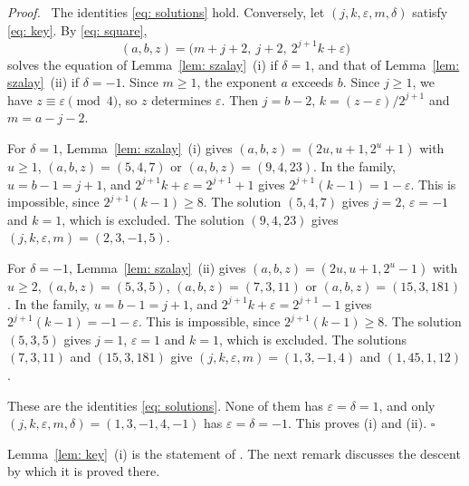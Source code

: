 \documentclass{article}
\newenvironment{proof}[1][Proof]{\par\medskip\noindent\textit{#1.}\ }{\hfill$\square$\par\medskip}
\newcommand{\Ge}{\geqslant}
\begin{document}
\begin{proof}
    The identities \eqref{eq: solutions} hold. Conversely, let $(j, k, \varepsilon, m, \delta)$ satisfy \eqref{eq: key}. By \eqref{eq: square},
    \begin{equation*}
        (a, b, z) = \bigl( m + j + 2 ,\ j + 2 ,\ 2^{j+1} k + \varepsilon \bigr)
    \end{equation*}
    solves the equation of Lemma~\ref{lem: szalay}~(i) if $\delta = 1$, and that of Lemma~\ref{lem: szalay}~(ii) if $\delta = -1$. Since $m \Ge 1$, the exponent $a$ exceeds $b$. Since $j \Ge 1$, we have $z \equiv \varepsilon \pmod 4$, so $z$ determines $\varepsilon$. Then $j = b - 2$, $k = (z - \varepsilon)/2^{j+1}$ and $m = a - j - 2$.

    For $\delta = 1$, Lemma~\ref{lem: szalay}~(i) gives $(a, b, z) = (2u, u + 1, 2^u + 1)$ with $u \Ge 1$, $(a, b, z) = (5, 4, 7)$ or $(a, b, z) = (9, 4, 23)$. In the family, $u = b - 1 = j + 1$, and $2^{j+1} k + \varepsilon = 2^{j+1} + 1$ gives $2^{j+1} (k - 1) = 1 - \varepsilon$. This is impossible, since $2^{j+1} (k - 1) \Ge 8$. The solution $(5, 4, 7)$ gives $j = 2$, $\varepsilon = -1$ and $k = 1$, which is excluded. The solution $(9, 4, 23)$ gives $(j, k, \varepsilon, m) = (2, 3, -1, 5)$.

    For $\delta = -1$, Lemma~\ref{lem: szalay}~(ii) gives $(a, b, z) = (2u, u + 1, 2^u - 1)$ with $u \Ge 2$, $(a, b, z) = (5, 3, 5)$, $(a, b, z) = (7, 3, 11)$ or $(a, b, z) = (15, 3, 181)$. In the family, $u = b - 1 = j + 1$, and $2^{j+1} k + \varepsilon = 2^{j+1} - 1$ gives $2^{j+1} (k - 1) = -1 - \varepsilon$. This is impossible, since $2^{j+1} (k - 1) \Ge 8$. The solution $(5, 3, 5)$ gives $j = 1$, $\varepsilon = 1$ and $k = 1$, which is excluded. The solutions $(7, 3, 11)$ and $(15, 3, 181)$ give $(j, k, \varepsilon, m) = (1, 3, -1, 4)$ and $(1, 45, 1, 12)$.

    These are the identities \eqref{eq: solutions}. None of them has $\varepsilon = \delta = 1$, and only $(j, k, \varepsilon, m, \delta) = (1, 3, -1, 4, -1)$ has $\varepsilon = \delta = -1$. This proves (i) and (ii).
\end{proof}

Lemma~\ref{lem: key}~(i) is the statement of \citep[Lemma~2]{sedaghat2020dual}. The next remark discusses the descent by which it is proved there.
\end{document}
